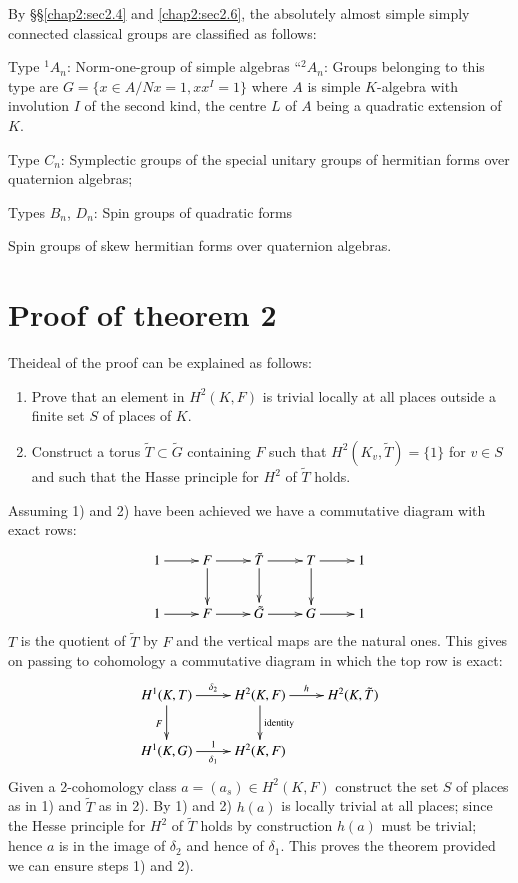 By \S \S \ref{chap2:sec2.4} and \ref{chap2:sec2.6}, the
absolutely almost simple simply 
connected classical groups are classified as follows: 

Type ${}^1A_n$: Norm-one-group of simple algebras ``${}^2A_n$: Groups
belonging to this type are $G= \bigg\{x \in A /Nx =1, xx^{I}=1
\bigg\}$ where $A$ is simple $K$-algebra with involution $I$ of the
second kind, the centre $L$ of $A$ being a quadratic extension of
$K$. 

\noindent
Type $C_n$: Symplectic groups of the special unitary groups of
hermitian forms over quaternion algebras; 

\noindent
Types $B_n$, $D_n$: Spin groups of quadratic forms

Spin groups of skew hermitian forms over quaternion algebras.

\section{Proof of theorem 2}\label{chap5:sec5.2}

The\pageoriginale ideal of the proof can be explained as follows:
\begin{enumerate} 
\item Prove that an element in $H^2(K,F)$ is trivial locally at all
  places outside a finite set $S$ of places of $K$. 

\item Construct a torus $\tilde{T} \subset \tilde{G}$ containing $F$
  such that $H^2 (K_v, \tilde{T})= \{1\}$ for $v \in S$ and such that
  the Hasse principle for $H^2$ of $\tilde{T}$ holds. 
\end{enumerate}

Assuming 1) and 2) have been achieved we have a commutative
diagram with exact rows: 
\[
\xymatrix{
1\ar[r] & F \ar[r] \ar[d] & \tilde{T} \ar[r] \ar[d] & T \ar[r] \ar[d]
& 1 \\
1 \ar[r] & F \ar[r] & \tilde{G} \ar[r] & G \ar[r] & 1
}
\]
$T$ is the quotient of $ \tilde{T}$ by $F$ and the vertical maps are
the natural ones. This gives on passing to cohomology a commutative
diagram in which the top row is exact: 
\[
\xymatrix{
H^1 (K,T) \ar[r]^{\delta_2} \ar[d]_{F} & H^2 (K,F) \ar[r]^{h}
\ar[d]^{\text{identity}} & H^2 (K, \tilde{T})\\
H^1(K,G) \ar[r]^1_{\delta_1} & H^2(K,F)
}
\]
 Given a 2-cohomology class $a= (a_s) \in H^2(K,F)$ construct the
 set $S$ of places as in 1) and $\tilde{T}$ as in 2). By 1) and
 2) $h(a)$ is locally trivial at all places; since the Hesse principle
 for $H^2$ of $\tilde{T}$ holds by construction $h(a)$ must be
 trivial; hence $a$ is in the image of $\delta_2$ and hence of
 $\delta_1$. This proves the theorem  provided we can ensure steps
 1) and 2). 
 
